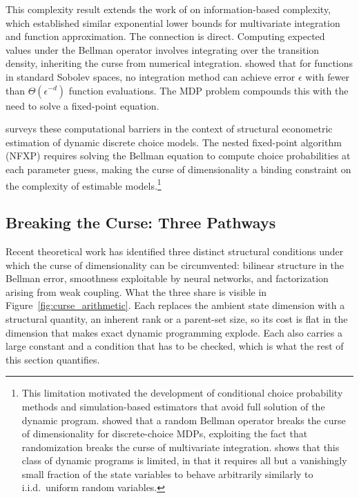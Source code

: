 This complexity result extends the work of \citet{traub1988} on information-based complexity, which established similar exponential lower bounds for multivariate integration and function approximation. The connection is direct. Computing expected values under the Bellman operator involves integrating over the transition density, inheriting the curse from numerical integration. \citeauthor{traub1988} showed that for functions in standard Sobolev spaces, no integration method can achieve error $\epsilon$ with fewer than $\Theta(\epsilon^{-d})$ function evaluations. The MDP problem compounds this with the need to solve a fixed-point equation.

\citet{rust1996numerical} surveys these computational barriers in the context of structural econometric estimation of dynamic discrete choice models. The nested fixed-point algorithm (NFXP) requires solving the Bellman equation to compute choice probabilities at each parameter guess, making the curse of dimensionality a binding constraint on the complexity of estimable models.\footnote{This limitation motivated the development of conditional choice probability methods \citep{HotzMiller1993} and simulation-based estimators that avoid full solution of the dynamic program. \citet{rust1997randomization} showed that a random Bellman operator breaks the curse of dimensionality for discrete-choice MDPs, exploiting the fact that randomization breaks the curse of multivariate integration. \citet{bray2022comment} shows that this class of dynamic programs is limited, in that it requires all but a vanishingly small fraction of the state variables to behave arbitrarily similarly to i.i.d.\ uniform random variables.}


\subsection{Breaking the Curse: Three Pathways}
\label{sec:breaking_curse}

Recent theoretical work has identified three distinct structural conditions under which the curse of dimensionality can be circumvented: bilinear structure in the Bellman error, smoothness exploitable by neural networks, and factorization arising from weak coupling. What the three share is visible in Figure~\ref{fig:curse_arithmetic}. Each replaces the ambient state dimension with a structural quantity, an inherent rank or a parent-set size, so its cost is flat in the dimension that makes exact dynamic programming explode. Each also carries a large constant and a condition that has to be checked, which is what the rest of this section quantifies.

